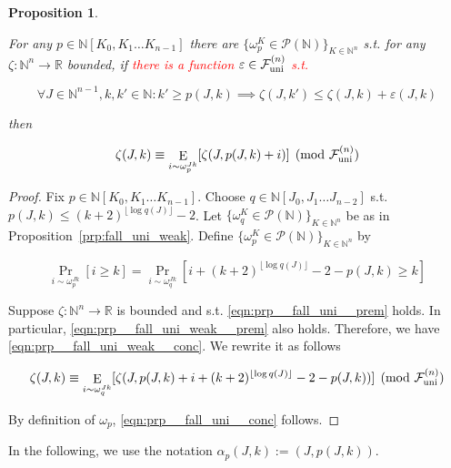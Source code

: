\documentclass[11pt]{article}
\numberwithin{equation}{section}
\theoremstyle{definition}
\theoremstyle{plain}
\newtheorem{proposition}{Proposition}[section]
\DeclareMathOperator{\Prb}{Pr}
\DeclareMathOperator{\E}{E}
\newcommand{\Nats}{\mathbb{N}}
\newcommand{\Reals}{\mathbb{R}}
\newcommand{\NatPoly}{\Nats[K_0, K_1 \ldots K_{n-1}]}
\newcommand{\NatPolyJ}{\Nats[J_0, J_1 \ldots J_{n-2}]}
\newcommand{\NatFun}{\Nats^n \rightarrow}
\newcommand{\Floor}[1]{\lfloor #1 \rfloor}
\newcommand{\Fall}{\mathcal{F}}
\newcommand{\FallU}{{\Fall_{\textnormal{uni}}^{(n)}}}
\begin{document}
\begin{samepage}
\begin{proposition}
\label{prp:fall_uni}

For any ${p \in \NatPoly}$ there are ${\{\omega_p^K \in \mathcal{P}(\Nats)\}_{K \in \Nats^n}}$ s.t. for any\\ $\zeta: \NatFun \Reals$ bounded, if \textcolor{red}{there is a function $\varepsilon\in\FallU$ s.t.}

\begin{equation}
\label{eqn:prp__fall_uni__prem}
\forall J \in \Nats^{n-1}, k,k' \in \Nats: k' \geq p(J,k) \implies \zeta(J,k') \leq \zeta(J,k) + \varepsilon(J,k)
\end{equation}

then

\begin{equation}
\label{eqn:prp__fall_uni__conc}
\zeta(J,k) \equiv \E_{i \sim \omega_p^{Jk}}[\zeta(J,p(J,k)+i)] \pmod \FallU
\end{equation}

\end{proposition}
\end{samepage}

\begin{proof}

Fix ${p \in \NatPoly}$. Choose ${q \in \NatPolyJ}$ s.t. ${p(J,k) \leq (k+2)^{\Floor{\log q(J)}}}-2$. Let ${\{\omega_q^K \in \mathcal{P}(\Nats)\}_{K \in \Nats^n}}$ be as in Proposition~\ref{prp:fall_uni_weak}. Define ${\{\omega_p^K \in \mathcal{P}(\Nats)\}_{K \in \Nats^n}}$ by

\[\Prb_{i \sim \omega_p^{Jk}}[i \geq k] = \Prb_{i \sim \omega_q^{Jk}}[i + (k+2)^{\Floor{\log q(J)}} - 2 - p(J,k) \geq k]\]

Suppose ${\zeta: \NatFun \Reals}$ is bounded and s.t. \ref{eqn:prp__fall_uni__prem} holds. In particular, \ref{eqn:prp__fall_uni_weak__prem} also holds. Therefore, we have \ref{eqn:prp__fall_uni_weak__conc}. We rewrite it as follows

\[\zeta(J,k) \equiv \E_{i \sim \omega_q^{Jk}}[\zeta(J, p(J,k) + i+ (k+2)^{\Floor{\log q(J)}} - 2 - p(J,k))] \pmod \FallU\]

By definition of ${\omega_p}$, \ref{eqn:prp__fall_uni__conc} follows.
%
\end{proof}

In the following, we use the notation ${\alpha_{p}(J,k):=(J,p(J,k))}$.
\end{document}
